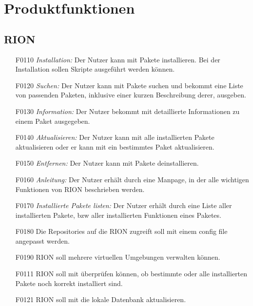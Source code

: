 \chapter{Produktfunktionen}

\section{RION}

\begin{itemize}
	\item[F0110] \textit{Installation:} Der Nutzer kann mit  Pakete installieren. Bei der Installation sollen Skripte ausgeführt werden können.
	\item[F0120] \textit{Suchen:} Der Nutzer kann mit  Pakete suchen und bekommt eine Liste von passenden Paketen, inklusive einer kurzen Beschreibung derer, ausgeben.
	\item[F0130] \textit{Information:} Der Nutzer bekommt mit  detaillierte Informationen zu einem Paket ausgegeben.
	\item[F0140] \textit{Aktualisieren:} Der Nutzer kann mit  alle installierten Pakete aktualisieren oder er kann mit  ein bestimmtes Paket aktualisieren.
	\item[F0150] \textit{Entfernen:} Der Nutzer kann mit  Pakete deinstallieren.
	\item[F0160] \textit{Anleitung:} Der Nutzer erhält durch  eine Manpage, in der alle wichtigen Funktionen von RION beschrieben werden.
	\item[F0170] \textit{Installierte Pakete listen:} Der Nutzer erhält durch  eine Liste aller installierten Pakete, bzw aller installierten Funktionen eines Paketes.
	\item[F0180] Die Repositories auf die RION zugreift soll mit einem config file angepasst werden.
	\item[F0190] RION soll mehrere virtuellen Umgebungen verwalten können.
	\item[F0111] RION soll mit 	 überprüfen können, ob bestimmte oder alle installierten Pakete noch korrekt installiert sind.
	\item[F0121] RION soll mit  die lokale Datenbank aktualisieren.
\end{itemize}


